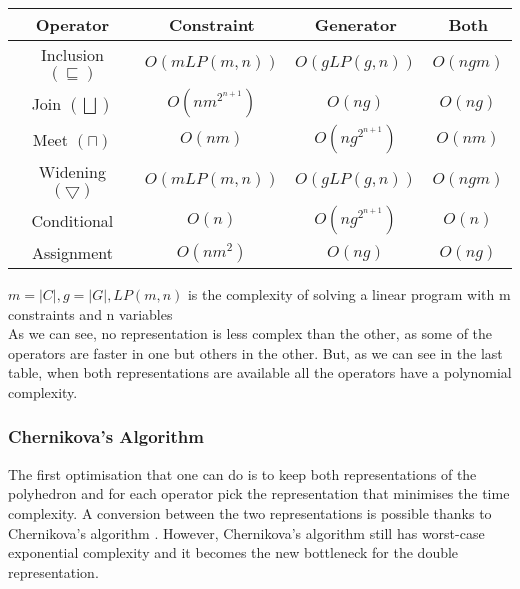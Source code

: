 \begin{center}
\begin{tabular}{||c c c c||} 
 
 \hline
 Operator & Constraint & Generator & Both \\ [0.5ex] 
 \hline
 Inclusion $(\sqsubseteq)$ & $O(mLP(m,n))$ & $O(gLP(g,n))$ & $O(ngm)$ \\ 
 \hline
 Join $(\bigsqcup)$ & $O(nm^{2^{n+1}})$ & $O(ng)$ & $O(ng)$ \\
 \hline
 Meet $(\sqcap)$ & $O(nm)$ & $O(ng^{2^{n+1}})$ & $O(nm)$\\
 \hline
 Widening $(\bigtriangledown)$ & $O(mLP(m,n))$ & $O(gLP(g,n))$ & $O(ngm)$ \\
 \hline
 Conditional & $O(n)$ & $O(ng^{2^{n+1}})$ & $O(n)$ \\ 
 \hline
 Assignment & $O(nm^2)$ & $O(ng)$ & $O(ng)$ \\ 
 
 
 \hline
\end{tabular}
\end{center}
$m=|C|,g=|G|,LP(m,n)$ is the complexity of solving a linear program with m constraints and n variables\\
As we can see, no representation is less complex than the other, as some of the operators are faster in one but others in the other. But, as we can see in the last table, when both representations are available all the operators have a polynomial complexity.\\
\subsubsection{Chernikova's Algorithm}
 The first optimisation that one can do is to keep both representations of the polyhedron and for each operator pick the representation that minimises the time complexity. A conversion between the two representations is possible thanks to Chernikova's algorithm \cite{chernikova1968algorithm}. However, Chernikova's algorithm still has worst-case exponential complexity and it becomes the new bottleneck for the double representation.
 
